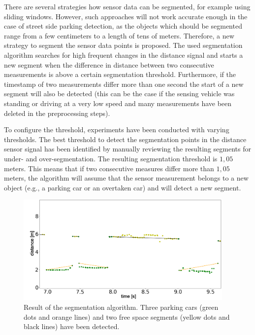 There are several strategies how sensor data can be segmented, for example using sliding windows. However, such approaches will not work accurate enough in the case of street side parking detection, as the objects which should be segmented range from a few centimeters to a length of tens of meters. Therefore, a new strategy to segment the sensor data points is proposed. The used segmentation algorithm searches for high frequent changes in the distance signal and starts a new segment when the difference in distance between two consecutive measurements is above a certain segmentation threshold. Furthermore, if the timestamp of two measurements differ more than one second the start of a new segment will also be detected (this can be the case if the sensing vehicle was standing or driving at a very low speed and many measurements have been deleted in the preprocessing steps). 


%


To configure the threshold, experiments have been conducted with varying thresholds. The best threshold to detect the segmentation points in the distance sensor signal has been identified by manually reviewing the resulting segments for under- and over-segmentation. The resulting segmentation threshold is $1,05$ meters. This means that if two consecutive measures differ more than $1,05$ meters, the algorithm will assume that the sensor measurement belongs to a new object (e.g., a parking car or an overtaken car) and will detect a new segment.

\begin{figure}
	\centering
	\includegraphics[width=0.95\textwidth]{img/segmentation_example.PNG}
	\caption{Result of the segmentation algorithm. Three parking cars (green dots and orange lines) and two free space segments (yellow dots and black lines) have been detected.}
	\label{fig:segmentation}
\end{figure}

